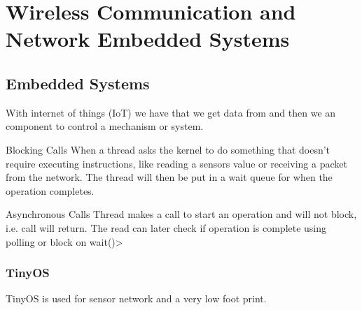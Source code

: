 \chapter{Wireless Communication and Network Embedded Systems}

\section{Embedded Systems}
With internet of things (IoT) we have  that we get data from and 
then we an  component to control a mechanism or system.


\begin{definitionblock}{Blocking Calls}
    When a thread asks the kernel to do something that doesn't require executing instructions,
    like reading a sensors value or receiving a packet from the network. 
    The thread will then be put in a wait queue for when the operation completes.
\end{definitionblock}

\begin{definitionblock}{Asynchronous Calls}
    Thread makes a call to start an operation and will not block, i.e. call will return.
    The read can later check if operation is complete using polling or block on wait()>
\end{definitionblock}



\subsection{TinyOS}
TinyOS is used for sensor network and a very low foot print.

